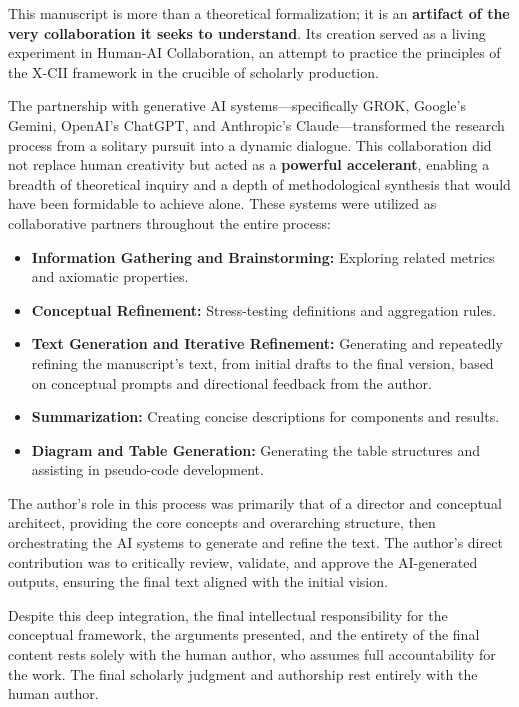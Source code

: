 \documentclass[a4paper]{article}
\begin{document}
This manuscript is more than a theoretical formalization; it is an \textbf{artifact of the very collaboration it seeks to understand}. Its creation served as a living experiment in Human-AI Collaboration, an attempt to practice the principles of the X-CII framework in the crucible of scholarly production.

The partnership with generative AI systems---specifically GROK, Google's Gemini, OpenAI's ChatGPT, and Anthropic's Claude---transformed the research process from a solitary pursuit into a dynamic dialogue. This collaboration did not replace human creativity but acted as a \textbf{powerful accelerant}, enabling a breadth of theoretical inquiry and a depth of methodological synthesis that would have been formidable to achieve alone. These systems were utilized as collaborative partners throughout the entire process:
\begin{itemize}
    \item \textbf{Information Gathering and Brainstorming:} Exploring related metrics and axiomatic properties.
    \item \textbf{Conceptual Refinement:} Stress-testing definitions and aggregation rules.
    \item \textbf{Text Generation and Iterative Refinement:} Generating and repeatedly refining the manuscript's text, from initial drafts to the final version, based on conceptual prompts and directional feedback from the author.
    \item \textbf{Summarization:} Creating concise descriptions for components and results.
    \item \textbf{Diagram and Table Generation:} Generating the table structures and assisting in pseudo-code development.
\end{itemize}

The author's role in this process was primarily that of a director and conceptual architect, providing the core concepts and overarching structure, then orchestrating the AI systems to generate and refine the text. The author's direct contribution was to critically review, validate, and approve the AI-generated outputs, ensuring the final text aligned with the initial vision.

Despite this deep integration, the final intellectual responsibility for the conceptual framework, the arguments presented, and the entirety of the final content rests solely with the human author, who assumes full accountability for the work. The final scholarly judgment and authorship rest entirely with the human author.
\end{document}
